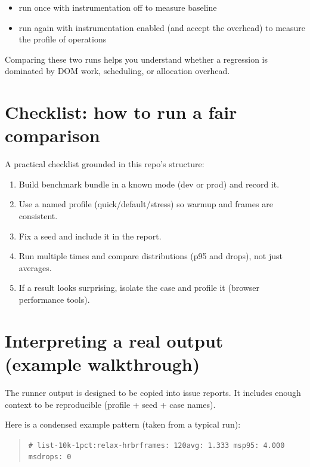 \begin{itemize}
\item run once with instrumentation off to measure baseline
\item run again with instrumentation enabled (and accept the overhead) to measure the profile of operations
\end{itemize}

Comparing these two runs helps you understand whether a regression is dominated by DOM work, scheduling, or allocation overhead.

\section{Checklist: how to run a fair comparison}

A practical checklist grounded in this repo's structure:

\begin{enumerate}
\item Build benchmark bundle in a known mode (dev or prod) and record it.
\item Use a named profile (quick/default/stress) so warmup and frames are consistent.
\item Fix a seed and include it in the report.
\item Run multiple times and compare distributions (p95 and drops), not just averages.
\item If a result looks surprising, isolate the case and profile it (browser performance tools).
\end{enumerate}

\section{Interpreting a real output (example walkthrough)}

The runner output is designed to be copied into issue reports.
It includes enough context to be reproducible (profile + seed + case names).

Here is a condensed example pattern (taken from a typical run):

\begin{quote}
	\texttt{\# list-10k-1pct:relax-hrbr\newline frames: 120\newline avg: 1.333 ms\newline p95: 4.000 ms\newline drops: 0}
\end{quote}

